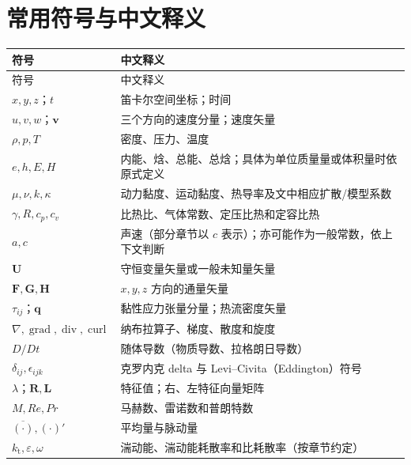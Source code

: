 \documentclass[11pt,a4paper,openany,fontset=none]{ctexbook}
\begin{document}
\chapter*{常用符号与中文释义}
\begingroup\small
\renewcommand{\arraystretch}{1.20}
\begin{longtable}{>{\centering\arraybackslash}p{}p{}}
\toprule 符号 & 中文释义 \\ \midrule
\endfirsthead
\toprule 符号 & 中文释义 \\ \midrule
\endhead
$x,y,z$；$t$ & 笛卡尔空间坐标；时间 \\
$u,v,w$；$\bm{v}$ & 三个方向的速度分量；速度矢量 \\
$\rho,p,T$ & 密度、压力、温度 \\
$e,h,E,H$ & 内能、焓、总能、总焓；具体为单位质量量或体积量时依原式定义 \\
$\mu,\nu,k,\kappa$ & 动力黏度、运动黏度、热导率及文中相应扩散/模型系数 \\
$\gamma,R,c_p,c_v$ & 比热比、气体常数、定压比热和定容比热 \\
$a,c$ & 声速（部分章节以 $c$ 表示）；亦可能作为一般常数，依上下文判断 \\
$\bm{U}$ & 守恒变量矢量或一般未知量矢量 \\
$\bm{F},\bm{G},\bm{H}$ & $x,y,z$ 方向的通量矢量 \\
$\tau_{ij}$；$\bm{q}$ & 黏性应力张量分量；热流密度矢量 \\
$\nabla,\operatorname{grad},\operatorname{div},\operatorname{curl}$ & 纳布拉算子、梯度、散度和旋度 \\
$D/Dt$ & 随体导数（物质导数、拉格朗日导数） \\
$\delta_{ij},\epsilon_{ijk}$ & 克罗内克 delta 与 Levi--Civita（Eddington）符号 \\
$\lambda$；$\bm{R},\bm{L}$ & 特征值；右、左特征向量矩阵 \\
$M,Re,Pr$ & 马赫数、雷诺数和普朗特数 \\
$\overline{(\cdot)},(\cdot)'$ & 平均量与脉动量 \\
$k_{\mathrm{t}},\varepsilon,\omega$ & 湍动能、湍动能耗散率和比耗散率（按章节约定） \\
\bottomrule
\end{longtable}
\endgroup

\clearpage
\makeatletter\@mainmattertrue\makeatother
{}

\end{document}
